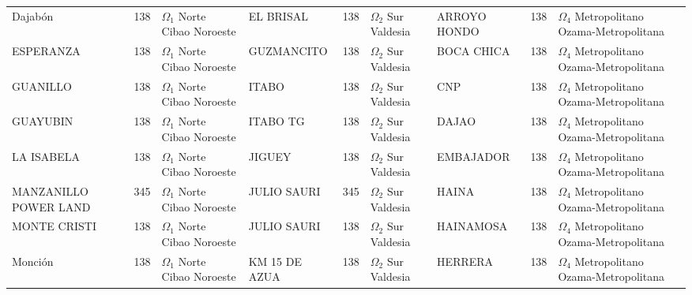 \begin{table}[!p]
{{\begin{tabular}{@{}lrl@{\hspace{3.5pt}}|@{\hspace{3.5pt}}lrl@{\hspace{3.5pt}}|@{\hspace{3.5pt}}lrl@{}}
Dajabón & 138 & \makecell[l]{$\Omega_1$ Norte\\Cibao Noroeste} & EL BRISAL & 138 & \makecell[l]{$\Omega_2$ Sur\\Valdesia} & ARROYO HONDO & 138 & \makecell[l]{$\Omega_4$ Metropolitano\\Ozama-Metropolitana} \\
ESPERANZA & 138 & \makecell[l]{$\Omega_1$ Norte\\Cibao Noroeste} & GUZMANCITO & 138 & \makecell[l]{$\Omega_2$ Sur\\Valdesia} & BOCA CHICA & 138 & \makecell[l]{$\Omega_4$ Metropolitano\\Ozama-Metropolitana} \\
GUANILLO & 138 & \makecell[l]{$\Omega_1$ Norte\\Cibao Noroeste} & ITABO & 138 & \makecell[l]{$\Omega_2$ Sur\\Valdesia} & CNP & 138 & \makecell[l]{$\Omega_4$ Metropolitano\\Ozama-Metropolitana} \\
GUAYUBIN & 138 & \makecell[l]{$\Omega_1$ Norte\\Cibao Noroeste} & ITABO TG & 138 & \makecell[l]{$\Omega_2$ Sur\\Valdesia} & DAJAO & 138 & \makecell[l]{$\Omega_4$ Metropolitano\\Ozama-Metropolitana} \\
LA ISABELA & 138 & \makecell[l]{$\Omega_1$ Norte\\Cibao Noroeste} & JIGUEY & 138 & \makecell[l]{$\Omega_2$ Sur\\Valdesia} & EMBAJADOR & 138 & \makecell[l]{$\Omega_4$ Metropolitano\\Ozama-Metropolitana} \\
MANZANILLO POWER LAND & 345 & \makecell[l]{$\Omega_1$ Norte\\Cibao Noroeste} & JULIO SAURI & 345 & \makecell[l]{$\Omega_2$ Sur\\Valdesia} & HAINA & 138 & \makecell[l]{$\Omega_4$ Metropolitano\\Ozama-Metropolitana} \\
MONTE CRISTI & 138 & \makecell[l]{$\Omega_1$ Norte\\Cibao Noroeste} & JULIO SAURI & 138 & \makecell[l]{$\Omega_2$ Sur\\Valdesia} & HAINAMOSA & 138 & \makecell[l]{$\Omega_4$ Metropolitano\\Ozama-Metropolitana} \\
Monción & 138 & \makecell[l]{$\Omega_1$ Norte\\Cibao Noroeste} & KM 15 DE AZUA & 138 & \makecell[l]{$\Omega_2$ Sur\\Valdesia} & HERRERA & 138 & \makecell[l]{$\Omega_4$ Metropolitano\\Ozama-Metropolitana} \\

\end{tabular}}}
\end{table}
